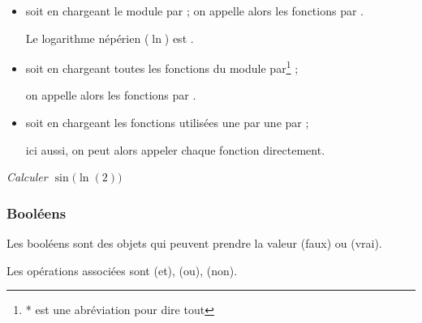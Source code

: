 \begin{itemize}
\item soit en chargeant le module par  ; on appelle alors les fonctions par .

Le logarithme népérien ($\ln$) est .

\item soit en chargeant toutes les fonctions du module par\footnote{* est une abréviation pour dire tout}  ; 

on appelle alors les fonctions par .

\item soit en chargeant les fonctions utilisées une par une par  ; 

ici aussi, on peut alors appeler chaque fonction directement.

\end{itemize}
\begin{Exercise}
{\it Calculer $\sin(\ln(2)\bigr)$}
\end{Exercise}
\subsubsection{Booléens}
Les booléens sont des objets qui peuvent prendre la valeur  (faux) ou  (vrai).

Les opérations associées sont  (et),  (ou),  (non).

